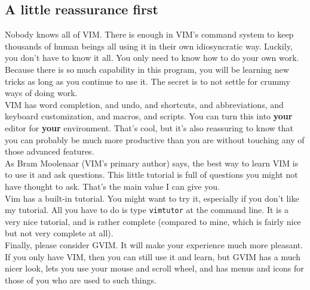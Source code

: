 \documentclass[a4paper, 12pt]{article}
\begin{document}
\subsection{A little reassurance first}
\label{"A little reassurance first"}
Nobody knows all of VIM. There is enough in VIM's command system to keep thousands of human beings all using it in their own idiosyncratic way. Luckily, you don't have to know it all. You only need to know how to do your own work. \\
Because there is so much capability in this program, you will be learning new tricks as long as you continue to use it. The secret is to not settle for crummy ways of doing work.\\
VIM has word completion, and undo, and shortcuts, and abbreviations, and keyboard customization, and macros, and scripts. You can turn this into {\bf your} editor for {\bf your} environment. That's cool, but it's also reassuring to know that you can probably be much more productive than you are without touching any of those advanced features.\\
As Bram Moolenaar (VIM's primary author) says, the best way to learn VIM is to use it and ask questions. This little tutorial is full of questions you might not have thought to ask. That's the main value I can give you. \\
Vim has a built-in tutorial. You might want to try it, especially if you don't like my tutorial. All you have to do is type {\tt vimtutor} at the command line. It is a very nice tutorial, and is rather complete (compared to mine, which is fairly nice but not very complete at all).\\
Finally, please consider GVIM. It will make your experience much more pleasant. If you only have VIM, then you can still use it and learn, but GVIM has a much nicer look, lets you use your mouse and scroll wheel, and has menus and icons for those of you who are used to such things.\\
\end{document}
